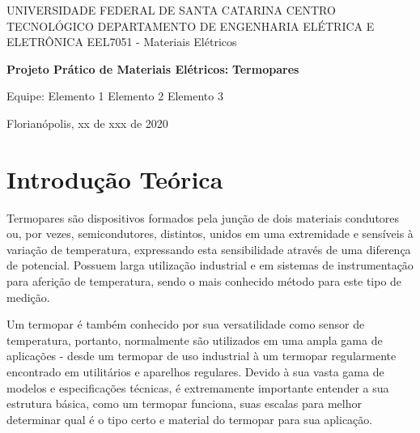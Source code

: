 \documentclass[a4paper,12pt]{article}
\begin{document}
\begin{titlepage}
    \center
    
    \Large{UNIVERSIDADE FEDERAL DE SANTA CATARINA CENTRO TECNOLÓGICO DEPARTAMENTO DE ENGENHARIA ELÉTRICA E ELETRÔNICA}
    \break
    \Large{EEL7051 - Materiais Elétricos}
    
    \hfill \break
    \hfill \break
    \hfill \break
    
    \large\textbf{Projeto Prático de Materiais Elétricos:}
    \break
    \large\textbf{Termopares}
    
    
    \hfill \break
    \hfill \break
    \hfill \break
    \hfill \break
    \hfill \break
    \hfill \break
    \hfill \break
    \hfill \break
    \hfill \break
    \hfill \break
    \hfill \break
    \hfill \break
    \hfill \break
    \hfill \break
    \hfill \break
    \normalsize
    Equipe: \break
    Elemento 1 \break
    Elemento 2 \break
    Elemento 3 \break
    
    \hfill \break
    \hfill \break
    \hfill \break
    \hfill \break
    \hfill \break
    \hfill \break
    \hfill \break
    \hfill \break
    \hfill \break
    \hfill \break
    \hfill \break
    \hfill \break
    \hfill \break
    \hfill \break
    \hfill \break
    \hfill \break
    \hfill \break


    Florianópolis, xx de xxx de 2020

    \vfill %
\end{titlepage}

\pagebreak
\listoffigures
\pagebreak
\tableofcontents
\pagebreak

\section{Introdução Teórica}

Termopares são dispositivos formados pela junção de dois materiais condutores ou, por vezes, semicondutores, distintos, unidos em uma extremidade e sensíveis à variação de temperatura, expressando esta sensibilidade através de uma diferença de potencial. Possuem larga utilização industrial e em sistemas de instrumentação para aferição de temperatura, sendo o mais conhecido método para este tipo de medição.

\noindent Um termopar é também conhecido por sua versatilidade como sensor de temperatura, portanto, normalmente são utilizados em uma ampla gama de aplicações - desde um termopar de uso industrial à um termopar regularmente encontrado em utilitários e aparelhos regulares. Devido à sua vasta gama de modelos e especificações técnicas, é extremamente importante entender a sua estrutura básica, como um termopar funciona, suas escalas para melhor determinar qual é o tipo certo e material do termopar para sua aplicação.
\end{document}
